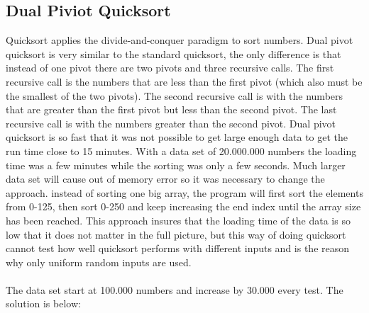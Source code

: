 \documentclass[a4paper, 11pt, titlepage]{article}
\begin{document}
\subsection{Dual Piviot Quicksort}
Quicksort applies the divide-and-conquer paradigm to sort numbers. Dual pivot quicksort is very similar to the standard quicksort, the only difference is that instead of one pivot there are two pivots and three recursive calls. The first recursive call is the numbers that are less than the first pivot (which also must be the smallest of the two pivots). The second recursive call is with the numbers that are greater than the first pivot but less than the second pivot. The last recursive call is with the numbers greater than the second pivot. Dual pivot quicksort is so fast that it was not possible to get large enough data to get the run time close to 15 minutes. With a data set of 20.000.000 numbers the loading time was a few minutes while the sorting was only a few seconds. Much larger data set will cause out of memory error so it was necessary to change the approach. instead of sorting one big array, the program will first sort the elements from 0-125, then sort 0-250 and keep increasing the end index until the array size has been reached. This approach insures that the loading time of the data is so low that it does not matter in the full picture, but this way of doing quicksort cannot test how well quicksort performs with different inputs and is the reason why only uniform random inputs are used. \\
\\
The data set start at 100.000 numbers and increase by 30.000 every test. The solution is below:
\end{document}
